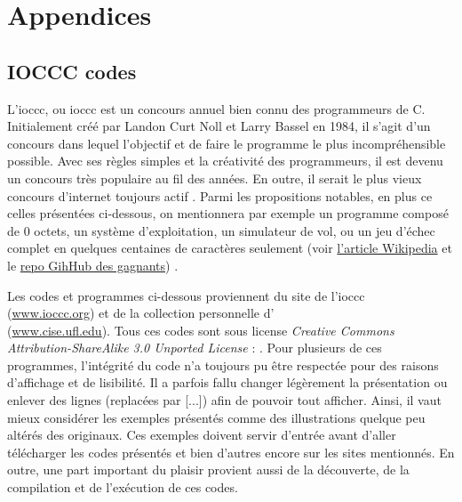 \documentclass[12pt]{article} %
\begin{document}
\newpage
\section{Appendices} \label{section:appendices}

\subsection{IOCCC codes} \label{ioccc-exemples}

L'\acrshort{ioccc}, ou \acrlong{ioccc} est un concours annuel bien connu des programmeurs de C. Initialement créé par Landon Curt Noll et Larry Bassel en 1984, il s'agit d'un concours dans lequel l'objectif et de faire le programme le plus incompréhensible possible. Avec ses règles simples et la créativité des programmeurs, il est devenu un concours très populaire au fil des années. En outre, il serait le plus vieux concours d'internet toujours actif \cite{IOCCC-readme-github}. Parmi les propositions notables, en plus ce celles présentées ci-dessous, on mentionnera par exemple un programme composé de 0 octets, un système d'exploitation, un simulateur de vol, ou un jeu d'échec complet en quelques centaines de caractères seulement (voir \href{https://en.wikipedia.org/wiki/International_Obfuscated_C_Code_Contest}{l'article Wikipedia} et le \href{https://github.com/ioccc-src/winner}{repo GihHub des gagnants}) \cite{Wikipedia-IOCCC} \cite{IOCCC-homepage}.

Les codes et programmes ci-dessous proviennent du site de l'\acrshort{ioccc} \\(\href{https://www.ioccc.org/}{www.ioccc.org}) et de la collection personnelle d'\citeauthor{MEnriqueBermudez-ObfuscatedCCode} \\(\href{https://www.cise.ufl.edu/~manuel/obfuscate/obfuscate.html}{www.cise.ufl.edu}). Tous ces codes sont sous license {\itshape\foreignlanguage{english}{ Creative Commons Attribution\hyp{}ShareAlike 3.0 Unported License}} : . Pour plusieurs de ces programmes, l'intégrité du code n'a toujours pu être respectée pour des raisons d'affichage et de lisibilité. Il a parfois fallu changer légèrement la présentation ou enlever des lignes (replacées par [...]) afin de pouvoir tout afficher. Ainsi, il vaut mieux considérer les exemples présentés comme des illustrations quelque peu altérés des originaux. Ces exemples doivent servir d'entrée avant d'aller télécharger les codes présentés et bien d'autres encore sur les sites mentionnés. En outre, une part important du plaisir provient aussi de la découverte, de la compilation et de l'exécution de ces codes.
\end{document}
